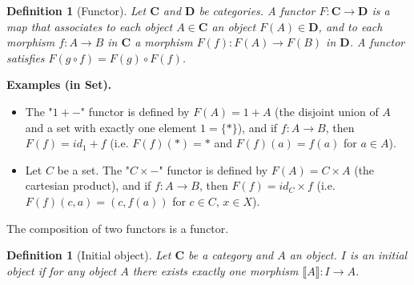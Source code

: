 \documentclass[11pt,a4paper]{article}
\newtheorem{defi}[theo]{Definition}
\newcommand{\itemz}{\item[$\triangleright$]}
\newcommand{\gr}{\textbf}
\newcommand{\lb}{\llbracket}
\newcommand{\rb}{\rrbracket}
\newcommand{\1}{\mathbbm{1}}
\begin{document}
\begin{defi}[Functor] Let $\gr{C}$ and $\gr{D}$ be categories. A functor $F : \gr{C} \to \gr{D}$ is a map that associates to each object $A \in \gr{C}$ an object $F(A) \in \gr{D}$, and to each morphism $f : A \to B$ in $\gr{C}$ a morphism $F(f) : F(A) \to F(B)$ in $\gr{D}$. A functor satisfies $F(g \circ f) = F(g) \circ F(f)$.
\end{defi}
\begin{center}
\end{center}

\gr{Examples (in \gr{Set}).} \begin{itemize}
\itemz The "$1+-$" functor is defined by $F(A) = 1 + A$ (the disjoint union of $A$ and a set with exactly one element $1 = \{*\}$), and if $f : A \to B$, then $F(f) = id_1 + f$ (i.e. $F(f)(*)=*$ and $F(f)(a) = f(a)$ for $a \in A$).
\itemz Let $C$ be a set. The "$C\times -$" functor is defined by $F(A) = C \times A$ (the cartesian product), and if $f : A \to B$, then $F(f) = id_C \times f$ (i.e. $F(f)(c,a) = (c,f(a))$ for $c \in C$, $x \in X$).
\end{itemize}
The composition of two functors is a functor.
\begin{defi}[Initial object]
Let $\gr{C}$ be a category and $A$ an object. $I$ is an initial object if for any object $A$ there exists exactly one morphism $\lb A \rb : I \to A$.
\end{defi}
\newpage
\end{document}
